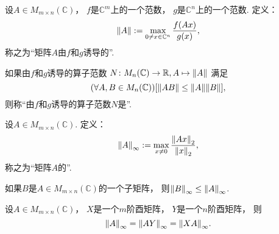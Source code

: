 \begin{definition}
设\(A \in M_{m \times n}(\mathbb{C})\)，
\(f\)是\(\mathbb{C}^m\)上的一个范数，
\(g\)是\(\mathbb{C}^n\)上的一个范数.
定义：\begin{equation}
	\norm{A}
	:=
	\max_{0 \neq x \in \mathbb{C}^n} \frac{f(Ax)}{g(x)},
\end{equation}
称之为“矩阵\(A\)由\(f\)和\(g\)诱导的”.
\end{definition}

\begin{definition}
如果由\(f\)和\(g\)诱导的算子范数
\(N\colon M_n(\mathbb{C}) \to \mathbb{R}, A \mapsto \norm{A}\)
满足\begin{equation*}
	(\forall A,B \in M_n(\mathbb{C}))
	[
		\norm{AB}
		\leq \norm{A} \norm{B}
	],
\end{equation*}
则称“由\(f\)和\(g\)诱导的算子范数\(N\)是”.
\end{definition}

\begin{definition}
设\(A \in M_{m \times n}(\mathbb{C})\).
定义：\begin{equation}
	\norm{A}_\infty
	:=
	\max_{x\neq0} \frac{\norm{Ax}_2}{\norm{x}_2},
\end{equation}
称之为“矩阵\(A\)的”.
\end{definition}

\begin{property}
如果\(B\)是\(A \in M_{m \times n}(\mathbb{C})\)的一个子矩阵，
则\(\norm{B}_\infty \leq \norm{A}_\infty\).
\end{property}

\begin{property}
设\(A \in M_{m \times n}(\mathbb{C})\)，
\(X\)是一个\(m\)阶酉矩阵，
\(Y\)是一个\(n\)阶酉矩阵，
则\begin{equation}
	\norm{A}_\infty
	= \norm{AY}_\infty
	= \norm{XA}_\infty.
\end{equation}
\end{property}
